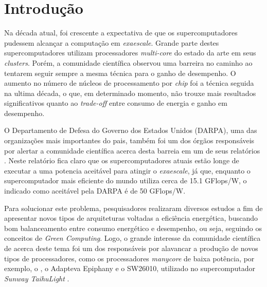 \documentclass[
    12pt,               %
    openright,          %
    twoside,            %
    a4paper,            %
    english,            %
    brazil,             %
    ]{abntex2}
\begin{document}
\textual


\chapter{Introdução}
\label{cap:introducao}

Na década atual, foi crescente a expectativa de que os supercomputadores pudessem alcançar a computação em \textit{exaescale}. Grande parte destes supercomputadores utilizam processadores \textit{multi-core} do estado da arte em seus \textit{clusters}. Porém, a comunidade científica observou uma barreira no caminho ao tentarem seguir sempre a mesma técnica para o ganho de desempenho. O aumento no número de núcleos de processamento por \textit{chip} foi a técnica seguida na ultima década, o que, em determinado momento, não trouxe mais resultados significativos quanto ao \textit{trade-off} entre consumo de energia e ganho em desempenho.

O Departamento de Defesa do Governo dos Estados Unidos (DARPA), uma das organizações mais importantes do pais, também foi um dos órgãos responsáveis por alertar a comunidade científica acerca desta barreia em um de seus relatórios \cite{darpa:exascale}. Neste relatório fica claro que os supercomputadores atuais estão longe de executar a uma potencia aceitável para atingir o \textit{exaescale}, já que, enquanto o supercomputador mais eficiente do mundo utiliza cerca de 15.1 GFlops/W, o indicado como aceitável pela DARPA é de 50 GFlops/W.

Para solucionar este problema, pesquisadores realizaram diversos estudos a fim de apresentar novos tipos de arquiteturas voltadas a eficiência energética, buscando bom balanceamento entre consumo energético e desempenho, ou seja, seguindo os conceitos de \textit{Green Computing}. Logo, o grande interesse da comunidade científica de \hpc acerca deste tema foi um dos responsáveis por alavancar a produção de novos tipos de processadores, como os processadores \textit{manycore} de baixa potência, por exemplo, o \mppa \cite{MPPA-2:2013}, o Adapteva Epiphany \cite{Olofsson2014} e o SW26010, utilizado no supercomputador \textit{Sunway TaihuLight} \cite{sunway:2016}.
\end{document}

